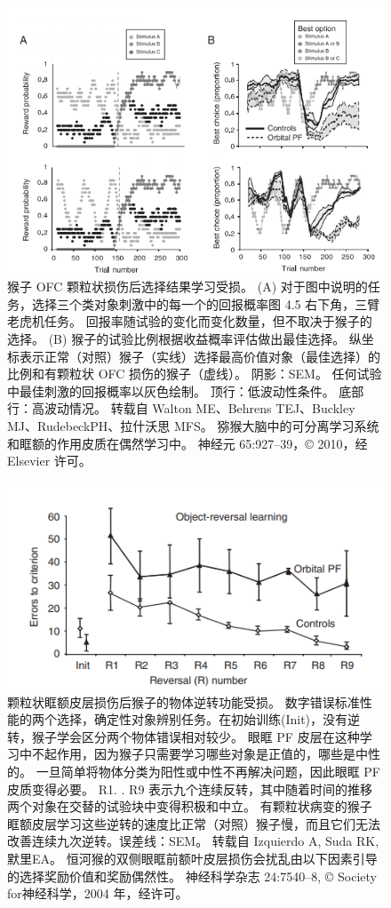 \begin{figure}[!htb]
	\centering
	\includegraphics{image_pfc/Fig_4_6}
	\caption{猴子 OFC 颗粒状损伤后选择结果学习受损。 (A) 对于图中说明的任务，选择三个类对象刺激中的每一个的回报概率图 4.5 右下角，三臂老虎机任务。 回报率随试验的变化而变化数量，但不取决于猴子的选择。 (B) 猴子的试验比例根据收益概率评估做出最佳选择。 纵坐标表示正常（对照）猴子（实线）选择最高价值对象（最佳选择）的比例和有颗粒状 OFC 损伤的猴子（虚线）。 阴影：SEM。 任何试验中最佳刺激的回报概率以灰色绘制。 顶行：低波动性条件。 底部行：高波动情况。 转载自 Walton ME、Behrens TEJ、Buckley MJ、RudebeckPH、拉什沃思 MFS。 猕猴大脑中的可分离学习系统和眶额的作用皮质在偶然学习中。 神经元 65:927–39，© 2010，经 Elsevier 许可。}
	\label{fig:fig_4_6}
\end{figure}


\begin{figure}[!htb]
	\centering
	\includegraphics{image_pfc/Fig_4_7}
	\caption{颗粒状眶额皮层损伤后猴子的物体逆转功能受损。 数字错误标准性能的两个选择，确定性对象辨别任务。在初始训练(Init)，没有逆转，猴子学会区分两个物体错误相对较少。 眼眶 PF 皮层在这种学习中不起作用，因为猴子只需要学习哪些对象是正值的，哪些是中性的。 一旦简单将物体分类为阳性或中性不再解决问题，因此眼眶 PF皮质变得必要。 R1. . R9 表示九个连续反转，其中随着时间的推移两个对象在交替的试验块中变得积极和中立。 有颗粒状病变的猴子眶额皮层学习这些逆转的速度比正常（对照）猴子慢，而且它们无法改善连续九次逆转。误差线：SEM。 转载自 Izquierdo A, Suda RK,默里EA。 恒河猴的双侧眼眶前额叶皮层损伤会扰乱由以下因素引导的选择奖励价值和奖励偶然性。 神经科学杂志 24:7540–8, © Society for神经科学，2004 年，经许可。}
	\label{fig:fig_4_7}
\end{figure}


